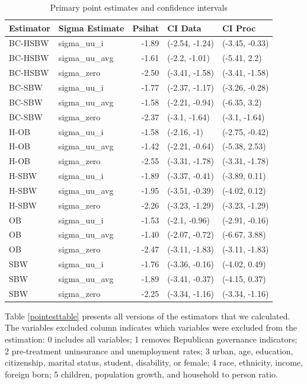 \documentclass[12pt]{article}
\begin{document}
\begin{table}[ht]
\centering
\begin{tabular}{llrll}
  \hline
Estimator & Sigma Estimate & Psihat & CI Data & CI Proc \\ 
  \hline
BC-HSBW & sigma\_uu\_i & -1.89 & (-2.54, -1.24) & (-3.45, -0.33) \\ 
  BC-HSBW & sigma\_uu\_avg & -1.61 & (-2.2, -1.01) & (-5.41, 2.2) \\ 
  BC-HSBW & sigma\_zero & -2.50 & (-3.41, -1.58) & (-3.41, -1.58) \\ 
  BC-SBW & sigma\_uu\_i & -1.77 & (-2.37, -1.17) & (-3.26, -0.28) \\ 
  BC-SBW & sigma\_uu\_avg & -1.58 & (-2.21, -0.94) & (-6.35, 3.2) \\ 
  BC-SBW & sigma\_zero & -2.37 & (-3.1, -1.64) & (-3.1, -1.64) \\ 
  H-OB & sigma\_uu\_i & -1.58 & (-2.16, -1) & (-2.75, -0.42) \\ 
  H-OB & sigma\_uu\_avg & -1.42 & (-2.21, -0.64) & (-5.38, 2.53) \\ 
  H-OB & sigma\_zero & -2.55 & (-3.31, -1.78) & (-3.31, -1.78) \\ 
  H-SBW & sigma\_uu\_i & -1.89 & (-3.37, -0.41) & (-3.89, 0.11) \\ 
  H-SBW & sigma\_uu\_avg & -1.95 & (-3.51, -0.39) & (-4.02, 0.12) \\ 
  H-SBW & sigma\_zero & -2.26 & (-3.23, -1.29) & (-3.23, -1.29) \\ 
  OB & sigma\_uu\_i & -1.53 & (-2.1, -0.96) & (-2.91, -0.16) \\ 
  OB & sigma\_uu\_avg & -1.40 & (-2.07, -0.72) & (-6.67, 3.88) \\ 
  OB & sigma\_zero & -2.47 & (-3.11, -1.83) & (-3.11, -1.83) \\ 
  SBW & sigma\_uu\_i & -1.76 & (-3.36, -0.16) & (-4.02, 0.49) \\ 
  SBW & sigma\_uu\_avg & -1.89 & (-3.41, -0.37) & (-4.15, 0.37) \\ 
  SBW & sigma\_zero & -2.25 & (-3.34, -1.16) & (-3.34, -1.16) \\ 
   \hline
\end{tabular}
\caption{Primary point estimates and confidence intervals}
\label{maintable1}
\end{table}

Table \ref{pointesttable} presents all versions of the estimators that we calculated. The variables excluded column indicates which variables were excluded from the estimation: 0 includes all variables; 1 removes Republican governance indicators; 2 pre-treatment uninsurance and unemployment rates; 3 urban, age, education, citizenship, marital status, student, disability, or female; 4 race, ethnicity, income, foreign born; 5 children, population growth, and household to person ratio.
\end{document}
